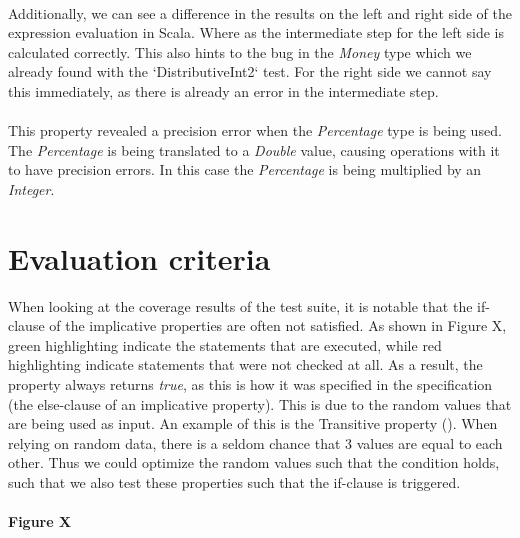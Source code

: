 \\
Additionally, we can see a difference in the results on the left and right side of the expression evaluation in Scala. Where as the intermediate step for the left side is calculated correctly. This also hints to the bug in the \textit{Money} type which we already found with the `DistributiveInt2` test. For the right side we cannot say this immediately, as there is already an error in the intermediate step.\\
\\
This property revealed a precision error when the \textit{Percentage} type is being used. The \textit{Percentage} is being translated to a \textit{Double} value, causing operations with it to have precision errors. In this case the \textit{Percentage} is being multiplied by an \textit{Integer}.

\section{Evaluation criteria}

When looking at the coverage results of the test suite, it is notable that the if-clause of the implicative properties are often not satisfied. As shown in Figure X, green highlighting indicate the statements that are executed, while red highlighting indicate statements that were not checked at all. As a result, the property always returns \textit{true}, as this is how it was specified in the specification (the else-clause of an implicative property). This is due to the random values that are being used as input. An example of this is the Transitive property (). When relying on random data, there is a seldom chance that 3 values are equal to each other. Thus we could optimize the random values such that the condition holds, such that we also test these properties such that the if-clause is triggered.\\
\\
\textbf{Figure X}

